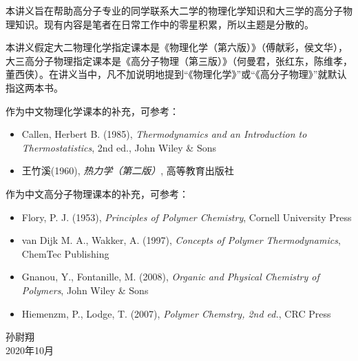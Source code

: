 \documentclass[main.tex]{subfiles}
\begin{document}
本讲义旨在帮助高分子专业的同学联系大二学的物理化学知识和大三学的高分子物理知识。现有内容是笔者在日常工作中的零星积累，所以主题是分散的。

本讲义假定大二物理化学指定课本是《物理化学（第六版）》（傅献彩，侯文华），大三高分子物理指定课本是《高分子物理（第三版）》（何曼君，张红东，陈维孝，董西侠）。在讲义当中，凡不加说明地提到“《物理化学》”或“《高分子物理》”就默认指这两本书。

作为中文物理化学课本的补充，可参考：
\begin{itemize}
    \item Callen, Herbert B. (1985), \emph{Thermodynamics and an Introduction to Thermostatistics}, 2nd ed., John Wiley \& Sons
    \item 王竹溪(1960), \emph{热力学（第二版）}, 高等教育出版社
\end{itemize}
作为中文高分子物理课本的补充，可参考：
\begin{itemize}
    \item Flory, P. J. (1953), \emph{Principles of Polymer Chemistry}, Cornell University Press
    \item van Dijk M. A., Wakker, A. (1997), \emph{Concepts of Polymer Thermodynamics}, ChemTec Publishing
    \item Gnanou, Y., Fontanille, M. (2008), \emph{Organic and Physical Chemistry of Polymers}, John Wiley \& Sons
    \item Hiemenzm, P., Lodge, T. (2007), \emph{Polymer Chemstry, 2nd ed.}, CRC Press
\end{itemize}



\begin{flushright}
    孙尉翔\\
    2020年10月
\end{flushright}
\end{document}
